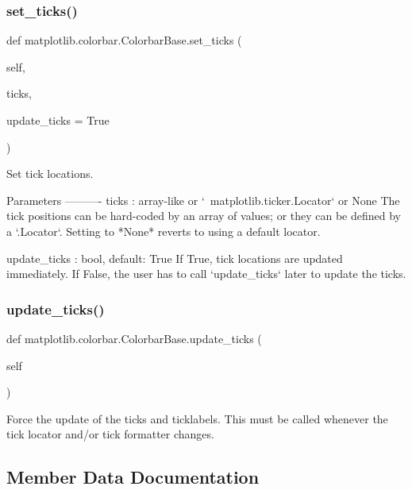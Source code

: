 \subsubsection{\texorpdfstring{set\+\_\+ticks()}{set\_ticks()}}
{\footnotesize\ttfamily def matplotlib.\+colorbar.\+Colorbar\+Base.\+set\+\_\+ticks (\begin{DoxyParamCaption}\item[{}]{self,  }\item[{}]{ticks,  }\item[{}]{update\+\_\+ticks = {\ttfamily True} }\end{DoxyParamCaption})}

\begin{DoxyVerb}Set tick locations.

Parameters
----------
ticks : array-like or `~matplotlib.ticker.Locator` or None
    The tick positions can be hard-coded by an array of values; or
    they can be defined by a `.Locator`. Setting to *None* reverts
    to using a default locator.

update_ticks : bool, default: True
    If True, tick locations are updated immediately.  If False, the
    user has to call `update_ticks` later to update the ticks.\end{DoxyVerb}
 \mbox{\label{classmatplotlib_1_1colorbar_1_1ColorbarBase_a06fc38a855f101d6ab40327b4033f6af}} 
\subsubsection{\texorpdfstring{update\+\_\+ticks()}{update\_ticks()}}
{\footnotesize\ttfamily def matplotlib.\+colorbar.\+Colorbar\+Base.\+update\+\_\+ticks (\begin{DoxyParamCaption}\item[{}]{self }\end{DoxyParamCaption})}

\begin{DoxyVerb}Force the update of the ticks and ticklabels. This must be
called whenever the tick locator and/or tick formatter changes.
\end{DoxyVerb}
 

\subsection{Member Data Documentation}
\mbox{\label{classmatplotlib_1_1colorbar_1_1ColorbarBase_a1079da131721a9ca9b6241ad638e9b5a}} 
